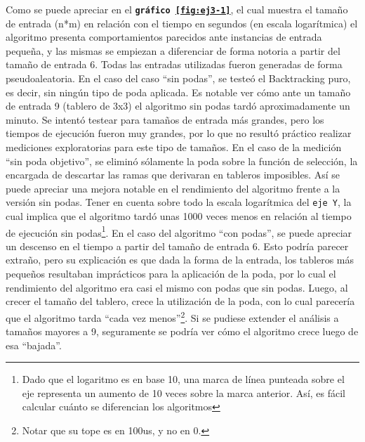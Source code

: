 \documentclass[11pt, a4paper, twoside]{article}
\begin{document}
Como se puede apreciar en el \textbf{\texttt{gráfico \ref{fig:ej3-1}}}, el cual
muestra el tamaño de entrada (n*m) en relación con el tiempo en segundos (en
escala logarítmica) el algoritmo presenta comportamientos parecidos ante
instancias de entrada pequeña, y las mismas se empiezan a diferenciar de forma
notoria a partir del tamaño de entrada 6. Todas las entradas utilizadas fueron
generadas de forma pseudoaleatoria. En el caso del caso ``sin podas'', se testeó
el Backtracking puro, es decir, sin ningún tipo de poda aplicada. Es notable ver
cómo ante un tamaño de entrada 9 (tablero de 3x3) el algoritmo sin podas tardó
aproximadamente un minuto. Se intentó testear para tamaños de entrada más
grandes, pero los tiempos de ejecución fueron muy grandes, por lo que no resultó
práctico realizar mediciones exploratorias para este tipo de tamaños. En el caso
de la medición ``sin poda objetivo'', se eliminó sólamente la poda sobre la
función de selección, la encargada de descartar las ramas que derivaran en
tableros imposibles. Así se puede apreciar una mejora notable en el rendimiento
del algoritmo frente a la versión sin podas. Tener en cuenta sobre todo la
escala logarítmica del \texttt{eje Y}, la cual implica que el algoritmo tardó
unas 1000 veces menos en relación al tiempo de ejecución sin podas\footnote{Dado
que el logaritmo es en base 10, una marca de línea punteada sobre el eje
representa un aumento de 10 veces sobre la marca anterior. Así, es fácil
calcular cuánto se diferencian los algoritmos}. En el caso del algoritmo ``con
podas'', se puede apreciar un descenso en el tiempo a partir del tamaño de
entrada 6. Esto podría parecer extraño, pero su explicación es que dada la forma
de la entrada, los tableros más pequeños resultaban imprácticos para la
aplicación de la poda, por lo cual el rendimiento del algoritmo era casi el
mismo con podas que sin podas. Luego, al crecer el tamaño del tablero, crece la
utilización de la poda, con lo cual parecería que el algoritmo tarda ``cada vez
menos''\footnote{Notar que su tope es en 100us, y no en 0.}. Si se pudiese
extender el análisis a tamaños mayores a 9, seguramente se podría ver cómo el
algoritmo crece luego de esa ``bajada''.
\end{document}
